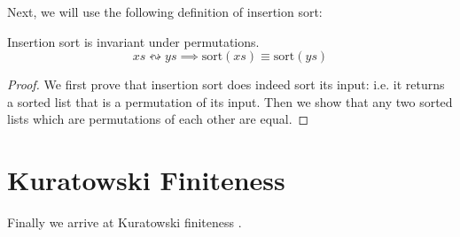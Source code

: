 Next, we will use the following definition of insertion sort:
\begin{lemma}
  Insertion sort is invariant under permutations.
  \begin{equation}
    \mathit{xs} \leftrightsquigarrow \mathit{ys} \implies \text{sort}(\mathit{xs}) \equiv \text{sort}(\mathit{ys})
  \end{equation}
\end{lemma}
\begin{proof}
  We first prove that insertion sort does indeed sort its input: i.e. it returns
  a sorted list that is a permutation of its input.
  Then we show that any two sorted lists which are permutations of each other
  are equal.
\end{proof}
\section{Kuratowski Finiteness} \label{kuratowski}
Finally we arrive at Kuratowski finiteness
\cite{kuratowskiNotionEnsembleFini1920}.
